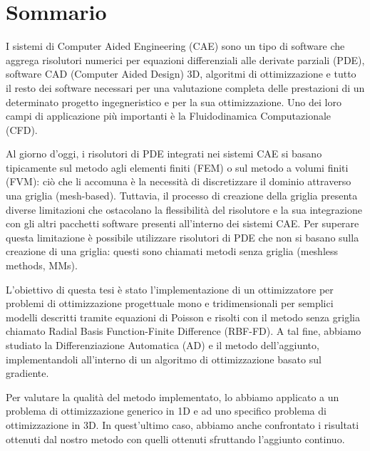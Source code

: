 \chapter{Sommario}

I sistemi di Computer Aided Engineering (CAE) sono un tipo di software che aggrega risolutori numerici per equazioni differenziali alle derivate parziali (PDE), software CAD (Computer Aided Design) 3D, algoritmi di ottimizzazione e tutto il resto dei software necessari per una valutazione completa delle prestazioni di un determinato progetto ingegneristico e per la sua ottimizzazione. Uno dei loro campi di applicazione più importanti è la Fluidodinamica Computazionale (CFD).

\medskip
Al giorno d'oggi, i risolutori di PDE integrati nei sistemi CAE si basano tipicamente sul metodo agli elementi finiti (FEM) o sul metodo a volumi finiti (FVM): ciò che li accomuna è la necessità di discretizzare il dominio attraverso una griglia (mesh-based). Tuttavia, il processo di creazione della griglia presenta diverse limitazioni che ostacolano la flessibilità del risolutore e la sua integrazione con gli altri pacchetti software presenti all'interno dei sistemi CAE. Per superare questa limitazione è possibile utilizzare risolutori di PDE che non si basano sulla creazione di una griglia: questi sono chiamati metodi senza griglia (meshless methods, MMs).

\medskip
L'obiettivo di questa tesi è stato l'implementazione di un ottimizzatore per problemi di ottimizzazione progettuale mono e tridimensionali per semplici modelli descritti tramite equazioni di Poisson e risolti con il metodo senza griglia chiamato Radial Basis Function-Finite Difference (RBF-FD). A tal fine, abbiamo studiato la Differenziazione Automatica (AD) e il metodo dell'aggiunto, implementandoli all'interno di un algoritmo di ottimizzazione basato sul gradiente.

\medskip
Per valutare la qualità del metodo implementato, lo abbiamo applicato a un problema di ottimizzazione generico in 1D e ad uno specifico problema di ottimizzazione in 3D. In quest'ultimo caso, abbiamo anche confrontato i risultati ottenuti dal nostro metodo con quelli ottenuti sfruttando l'aggiunto continuo.